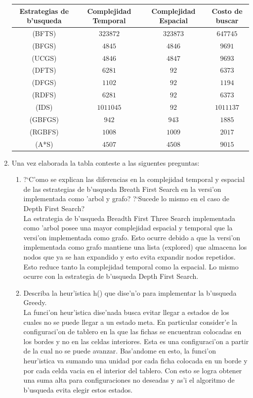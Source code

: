 \documentclass[11pt]{article}
\begin{document}
\begin{enumerate}
\begin{tabular}{|c|c|c|c|}
\hline	
Estrategias de b'usqueda & Complejidad Temporal & Complejidad Espacial & Costo de buscar \\ \hline
(BFTS) & $323872$ & $323873$ & $647745$ \\ \hline
(BFGS) & $4845$ & $4846$ & $9691$ \\ \hline
(UCGS) & $4846$ & $4847$ & $9693$ \\ \hline
(DFTS) & $6281$ & $92$ & $6373$ \\ \hline
(DFGS) & $1102$ & $92$ & $1194$ \\ \hline
(RDFS) & $6281$ & $92$ & $6373$ \\ \hline
(IDS) & $1011045$ & $92$ & $1011137$ \\ \hline
(GBFGS) & $942$ & $943$ & $1885$ \\ \hline
(RGBFS) & $1008$ & $1009$ & $2017$ \\ \hline
(A*S) & $4507$ & $4508$ & $9015$ \\ \hline
\end{tabular}	

\item Una vez elaborada la tabla conteste a las siguentes preguntas:
	\begin{enumerate}
	
	\item ?`C'omo se explican las diferencias en la complejidad temporal y espacial de las estrategias de b'usqueda Breath First Search en la versi'on implementada como 'arbol y grafo? ?`Sucede lo mismo en el caso de Depth First Search?\\
	
	La estrategia de b'usqueda Breadth First Three Search implementada como 'arbol posee una mayor complejidad espacial y temporal que la versi'on implementada como grafo.
	Esto ocurre debido a que la versi'on implementada como grafo mantiene una lista (explored) que almacena los nodos que ya se han expandido y esto evita expandir nodos repetidos. Esto reduce tanto la complejidad temporal como la espacial. Lo mismo ocurre con la estrategia de b'usqueda Depth First Search. \\
	
	\item Describa la heur'istica h() que dise'n'o para implementar la b'usqueda Greedy. \\
	
	La funci'on heur'istica dise'nada busca evitar llegar a estados de los cuales no se puede llegar a un estado meta. En particular consider'e la configuraci'on de tablero en la que las fichas se encuentran colocadas en los bordes y no en las celdas interiores. Esta es una configuraci'on a partir de la cual no se puede avanzar. Bas'andome en esto, la funci'on heur'istica va sumando una unidad por cada ficha colocada en un borde y por cada celda vacia en el interior del tablero. Con esto se logra obtener una suma alta para configuraciones no deseadas y as'i el algoritmo de b'usqueda evita elegir estos estados. \\
	

\end{enumerate}
\end{enumerate}
\end{document}
